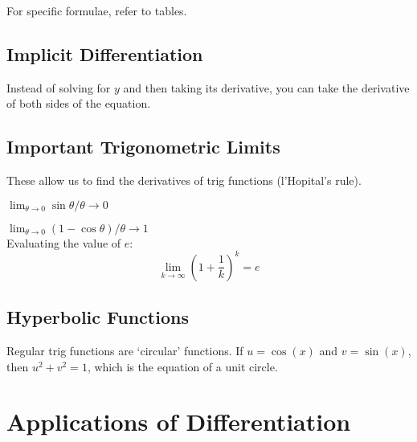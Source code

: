 For specific formulae, refer to tables.

\subsection*{Implicit Differentiation}
Instead of solving for $y$ and then taking its derivative, you can take the derivative of both sides of the equation.

\subsection*{Important Trigonometric Limits}
These allow us to find the derivatives of trig functions (l'Hopital's rule).

$\lim_{\theta \rightarrow 0} \sin \theta / \theta \rightarrow 0$ 

$\lim_{\theta \rightarrow 0} (1 - \cos \theta) / \theta \rightarrow 1$ \\

Evaluating the value of $e$:
\begin{equation*}
  \lim_{k \rightarrow \infty} \left(1 + \frac{1}{k}\right)^k = e
\end{equation*}

\subsection*{Hyperbolic Functions}
Regular trig functions are `circular' functions. If $u = \cos(x)$ and $v = \sin(x)$, then $u^2 + v^2 = 1$, which is the equation of a unit circle.

\section{Applications of Differentiation}